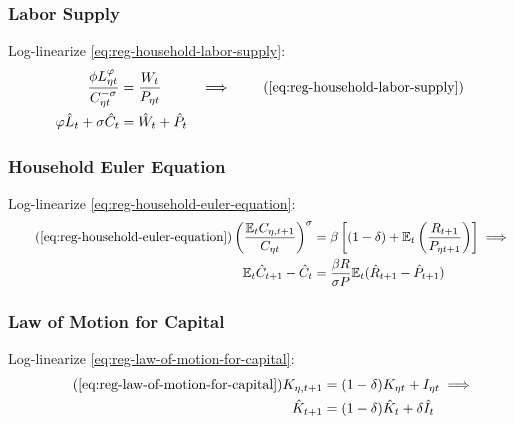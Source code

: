 \documentclass[
	thesis.tex
	]{subfiles}
\begin{document}

\subsubsection{Labor Supply}

Log-linearize \ref{eq:reg-household-labor-supply}:
\begin{alignat}{2}
	\frac{\phi L_{\eta t}^{\varphi}}{C_{\eta t}^{-\sigma}} &= \frac{W_t}{P_{\eta t}} & \implies \tag{\ref{eq:reg-household-labor-supply}} \\
	\varphi \hat{L}_t + \sigma \hat{C}_t &= \hat{W}_t + \hat{P}_t & \label{eq:reg-ll-labor-supply}
\end{alignat}


\subsubsection{Household Euler Equation}

Log-linearize \ref{eq:reg-household-euler-equation}:
\begin{align}
	\tag{\ref{eq:reg-household-euler-equation}}
	\left( \frac{\mathbb{E}_t C_{\eta, t+1}}{C_{\eta t}} \right)^\sigma &= \beta \left[ (1-\delta) + \mathbb{E}_t \left(\frac{R_{t+1}}{P_{\eta t+1}}\right) \right] \implies \\
	\label{eq:reg-ll-household-euler-equation}
	\E \hat{C}_{t+1} - \hat{C}_t &= \frac{\beta R}{\sigma P} \E(\hat{R}_{t+1} - \hat{P}_{t+1})
\end{align}


\subsubsection{Law of Motion for Capital}

Log-linearize \ref{eq:reg-law-of-motion-for-capital}:
\begin{align}
	\tag{\ref{eq:reg-law-of-motion-for-capital}}
	K_{\eta, t+1} &= (1-\delta)K_{\eta t} + I_{\eta t} \implies \\
	\label{eq:reg-ll-law-of-motion-for-capital}
	\hat{K}_{t+1} &= (1-\delta)\hat{K}_t + \delta \hat{I}_t
\end{align}

\end{document}
